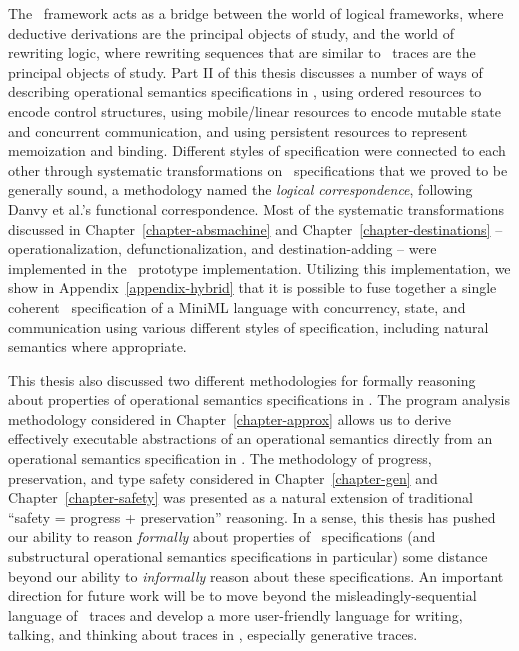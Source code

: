 The \sls~framework acts as a bridge between the world of logical
frameworks, where deductive derivations are the principal objects of
study, and the world of rewriting logic, where rewriting sequences
that are similar to \sls~traces are the principal objects of
study. Part II of this thesis discusses a number of ways of describing
operational semantics specifications in \sls, using ordered resources
to encode control structures, using mobile/linear resources to encode
mutable state and concurrent communication, and using persistent
resources to represent memoization and binding. Different styles of
specification were connected to each other through systematic
transformations on \sls~specifications that we proved to be generally
sound, a methodology named the {\it logical correspondence}, following
Danvy et al.'s functional correspondence. Most of the systematic
transformations discussed in Chapter~\ref{chapter-absmachine} and
Chapter~\ref{chapter-destinations} -- operationalization,
defunctionalization, and destination-adding -- were implemented in the
\sls~prototype implementation. Utilizing this implementation, we show
in Appendix~\ref{appendix-hybrid} that it is possible to fuse together
a single coherent \sls~specification of a MiniML language with
concurrency, state, and communication using various different styles
of specification, including natural semantics where appropriate.


This thesis also discussed two different methodologies for formally
reasoning about properties of operational semantics specifications in
\sls. The program analysis methodology considered in
Chapter~\ref{chapter-approx} allows us to derive effectively
executable abstractions of an operational semantics directly from an
operational semantics specification in \sls. The methodology of
progress, preservation, and type safety considered in
Chapter~\ref{chapter-gen} and Chapter~\ref{chapter-safety} was
presented as a natural extension of traditional ``safety = progress +
preservation'' reasoning. In a sense, this thesis has pushed our
ability to reason {\it formally} about properties of
\sls~specifications (and substructural operational semantics
specifications in particular) some distance beyond our ability to {\it
  informally} reason about these specifications. An important
direction for future work will be to move beyond the
misleadingly-sequential language of \sls~traces and develop a more
user-friendly language for writing, talking, and thinking about traces
in \sls, especially generative traces.
